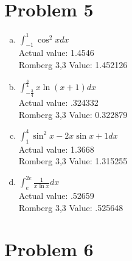 \documentclass[11pt]{article} %
\begin{document}
\section*{Problem 5}
\begin{enumerate}[a.)]
\item $\int_{-1}^{1} \cos^2xdx$\\
Actual value: 1.4546 \\
Romberg 3,3 Value: 1.452126

\item $\int_{-\frac{3}{4}}^{\frac{3}{4}} x \ln(x+1) dx$\\
Actual value: .324332 \\
Romberg 3,3 Value: 0.322879

\item $\int_{1}^{4} \sin^2x - 2x\sin x +1 dx$\\
Actual value: 1.3668 \\
Romberg 3,3 Value: 1.315255

\item $\int_{e}^{2e} \frac{1}{x\ln x}dx$\\
Actual value: .52659\\
Romberg 3,3 Value: .525648
\end{enumerate}

\section*{Problem 6}
\end{document}
